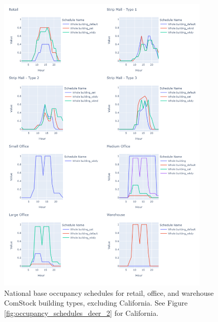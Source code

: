 \begin{figure}
    \centering \includegraphics[trim={0 0 0 0}, clip,  %
    width=0.9\textwidth]{figures/occupancy_schedules_2.png}
    \caption[National base occupancy schedules excluding California]{National base occupancy schedules for retail, office, and warehouse ComStock building types, excluding California. See Figure \ref{fig:occupancy_schedules_deer_2} for California.}
    \label{fig:occupancy_schedules_2}
\end{figure}